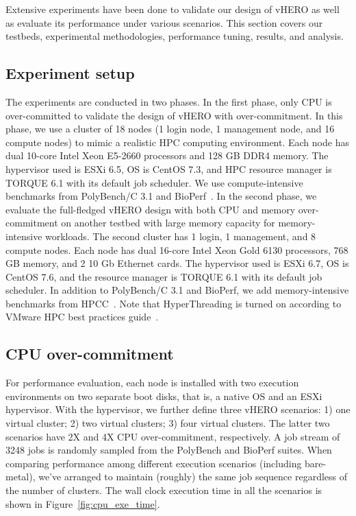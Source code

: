 Extensive experiments have been done to validate our design of vHERO as well as evaluate 
its performance under various scenarios. This section covers our testbeds, experimental 
methodologies, performance tuning, results, and analysis. 

\subsection{Experiment setup}
The experiments are conducted in two phases. In the first phase, only CPU is over-committed 
to validate the design of vHERO with over-commitment. In this phase, we use a cluster of 18 nodes (1 login node, 1 management node, and 16 compute nodes) to mimic a realistic HPC computing environment. Each node has dual 10-core Intel Xeon E5-2660 processors and 128 GB DDR4 memory. %
The hypervisor used is ESXi 6.5, OS is CentOS 7.3, and HPC resource manager is TORQUE 6.1 with its default job scheduler. We use compute-intensive benchmarks from PolyBench/C 3.1 and BioPerf~\cite{1526013}. 
In the second phase, we evaluate the full-fledged vHERO design with both CPU and memory over-commitment on another testbed with large memory capacity for memory-intensive workloads. The second cluster has 1 login, 1 management, and 8 compute nodes. Each node has dual 16-core Intel Xeon Gold 6130 processors, 768 GB memory, and 2 10 Gb Ethernet cards. %
The hypervisor used is ESXi 6.7, OS is CentOS 7.6, and the resource manager is TORQUE 6.1 with its default job scheduler. 
In addition to PolyBench/C 3.1 and BioPerf, we add memory-intensive benchmarks from HPCC~\cite{dongarra2004introduction}. Note that HyperThreading is turned on according to VMware HPC best practices guide~\cite{hpc2018best}. 

\subsection{CPU over-commitment}
For performance evaluation, each node is installed with two execution environments on two separate boot disks, that is, a native OS and an ESXi hypervisor. With the hypervisor, we further define three vHERO scenarios: 1) one virtual cluster; 2) two virtual clusters; 3) four virtual clusters. The latter two scenarios have 2X and 4X CPU over-commitment, respectively. A job stream of 3248 jobs is randomly sampled from the PolyBench and BioPerf suites. 
When comparing performance among different execution scenarios (including bare-metal), we've arranged to maintain (roughly) the same job sequence regardless of the number of clusters. The wall clock execution time in all the scenarios is shown in Figure~\ref{fig:cpu_exe_time}.

